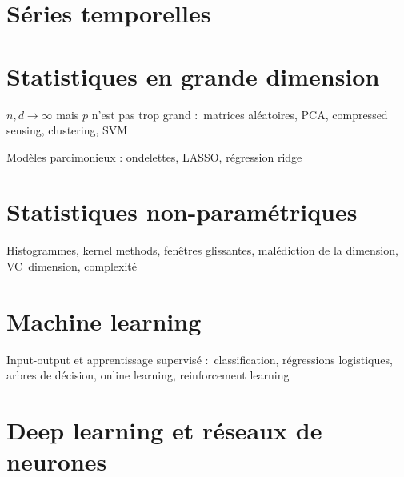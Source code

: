 \documentclass[
  10,
  letterpaper,
  DIV=11,
  numbers=noendperiod]{scrreport}
\theoremstyle{plain}
\theoremstyle{definition}
\theoremstyle{plain}
\theoremstyle{definition}
\theoremstyle{definition}
\theoremstyle{plain}
\theoremstyle{remark}
\begin{document}

\hypertarget{suxe9ries-temporelles}{%
\section*{Séries temporelles}\label{suxe9ries-temporelles}}


\hypertarget{statistiques-en-grande-dimension}{%
\section*{Statistiques en grande
dimension}\label{statistiques-en-grande-dimension}}


\(n,d\to\infty\) mais \(p\) n'est pas trop grand :~matrices aléatoires,
PCA, compressed sensing, clustering, SVM

Modèles parcimonieux : ondelettes, LASSO, régression ridge

\hypertarget{statistiques-non-paramuxe9triques}{%
\section*{Statistiques
non-paramétriques}\label{statistiques-non-paramuxe9triques}}


Histogrammes, kernel methods, fenêtres glissantes, malédiction de la
dimension, VC~dimension, complexité

\hypertarget{machine-learning}{%
\section*{Machine learning}\label{machine-learning}}


Input-output et apprentissage supervisé :~classification, régressions
logistiques, arbres de décision, online learning, reinforcement learning

\hypertarget{deep-learning-et-ruxe9seaux-de-neurones}{%
\section*{Deep learning et réseaux de
neurones}\label{deep-learning-et-ruxe9seaux-de-neurones}}
\end{document}
